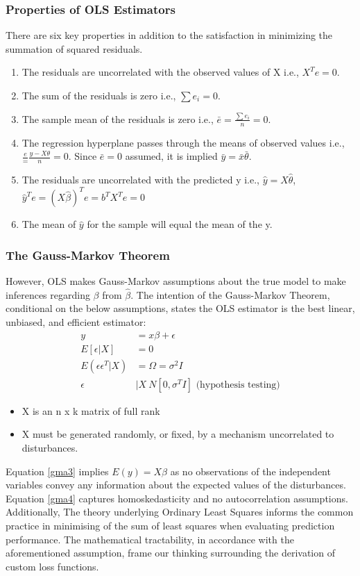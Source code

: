 \documentclass[12pt]{article}
\begin{document}
\subsubsection{Properties of OLS Estimators}
There are six key properties in addition to the satisfaction in minimizing the summation of squared residuals.
\begin{enumerate}
	\item The residuals are uncorrelated with the observed values of X i.e., $X^{T}e=0$.
	\item The sum of the residuals is zero i.e., $\sum e_i=0$.
	\item The sample mean of the residuals is zero i.e., $\bar{e} = \frac{\sum e_i}{n} = 0$.
	\item The regression hyperplane passes through the means of observed values i.e., $\frac{e} = \frac{y - X\theta}{n} = 0$. Since $\bar{e} = 0$ assumed, it is implied $\bar{y}=\bar{x}\bar{\theta}$.
	\item The residuals are uncorrelated with the predicted y i.e., $\hat{y} = X\hat{\theta}$, $\hat{y}^{T}e = (X\hat{\beta})^{T}e = b^{T}X^{T}e = 0$ 
	\item The mean of $\hat{y}$ for the sample will equal the mean of the y.
\end{enumerate}
\subsubsection{The Gauss-Markov Theorem}
However, OLS makes Gauss-Markov assumptions about the true model to make inferences regarding $\beta$ from $\hat{\beta}$.
The intention of the Gauss-Markov Theorem, conditional on the below assumptions, states the OLS estimator is the best linear, unbiased, and efficient estimator: 
\begin{align}
	y &= x\beta + \epsilon\\
	E[\epsilon|X] &= 0 \label{gma3}\\
	E(\epsilon \epsilon^{T}|X) &= \Omega = \sigma^{2}I \label{gma4}\\
	\epsilon &| X ~ N[0,\sigma^{T}I] \text{ (hypothesis testing)}
\end{align}
\begin{itemize}
	\item X is an n x k matrix of full rank
	\item X must be generated randomly, or fixed, by a mechanism uncorrelated to disturbances.
\end{itemize}
Equation \ref{gma3} implies $E(y) = X\beta$ as no observations of the independent variables convey any information about the expected values of the disturbances.
Equation \ref{gma4} captures homoskedasticity and no autocorrelation assumptions.
Additionally,
The theory underlying Ordinary Least Squares informs the common practice in minimising of the sum of least squares when evaluating prediction performance.
The mathematical tractability, in accordance with the aforementioned assumption, frame our thinking surrounding the derivation of custom loss functions.
\end{document}
